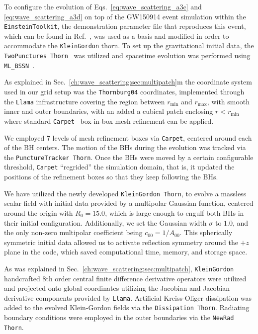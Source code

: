 To configure the evolution of Eqs.~\eqref{eq:wave_scattering_a3c} and \eqref{eq:wave_scattering_a3d} on top of the GW150914 event simulation within the \texttt{EinsteinToolkit}, the demonstration parameter file that reproduces this event, which can be found in Ref.~\cite{GW150914Demo}, was used as a basis and modified in order to accommodate the \texttt{KleinGordon} thorn. To set up the gravitational initial data, the \texttt{TwoPunctures Thorn}~\cite{Ansorg:2004ds} was utilized and spacetime evolution was performed using \texttt{ML\_BSSN}~\cite{Brown:2008sb,Kranc:web,McLachlan:web}.

As explained in Sec.~\ref{ch:wave_scattering:sec:multipatch}m the coordinate system used in our grid setup was the \texttt{Thornburg04} coordinates, implemented through the \texttt{Llama} infrastructure covering the region between $r_\text{min}$ and $r_\text{max}$, with smooth inner and outer boundaries, with an added a cubical patch enclosing $r < r_\text{min}$ where standard \texttt{Carpet}~\cite{Schnetter:2003rb} box-in-box mesh refinement can be applied.

We employed 7 levels of mesh refinement boxes via \texttt{Carpet}, centered around each of the BH centers. The motion of the BHs during the evolution was tracked via the \texttt{PunctureTracker Thorn}. Once the BHs were moved by a certain configurable threshold, \texttt{Carpet} ``regrided'' the simulation domain, that is, it updated the positions of the refinement boxes so that they keep following the BHs.

We have utilized the newly developed \texttt{KleinGordon Thorn}, to evolve a massless scalar field with initial data provided by a multipolar Gaussian function, centered around the origin with $R_0 = 15.0$, which is large enough to engulf both BHs in their initial configuration. Additionally, we set the Gaussian width $\sigma$ to $1.0$, and the only non-zero multipolar coefficient being $c_{00} = 1 / A_{00}$. This spherically symmetric initial data allowed us to activate reflection symmetry around the $+z$ plane in the code, which saved computational time, memory, and storage space.

As was explained in Sec.~\ref{ch:wave_scattering:sec:multipatch}, \texttt{KleinGordon} handcrafted 8th order central finite difference derivative operators were utilized and projected onto global coordinates utilizing the Jacobian and Jacobian derivative components provided by \texttt{Llama}. Artificial Kreiss-Oliger dissipation was added to the evolved Klein-Gordon fields via the \texttt{Dissipation Thorn}. Radiating boundary conditions were employed in the outer boundaries via the \texttt{NewRad Thorn}.

